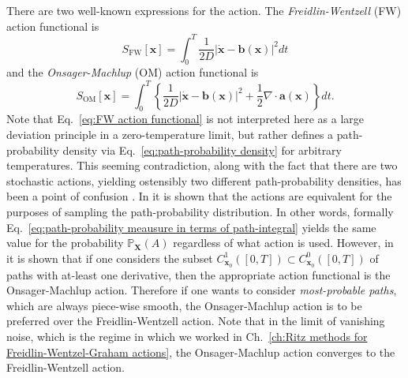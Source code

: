 There are two well-known expressions for the action. The \textit{Freidlin-Wentzell} (FW) action functional is \citep{adibStochasticActionsDiffusive2008, ventselSMALLRANDOMPERTURBATIONS1970, touchetteLargeDeviationApproach2009, grafkeNumericalComputationRare2019}
\begin{equation} \label{eq:FW action functional}
S_\text{FW}[\mathbf{x}] = \int_0^T \frac{1}{2 D} |\dot{\mathbf{x}} - \mathbf{b}(\mathbf{x})|^2 dt
\end{equation}
and the \textit{Onsager-Machlup} (OM) action functional is \citep{adibStochasticActionsDiffusive2008, durrOnsagerMachlupFunctionLagrangian1978a, stratonovichProbabilityFunctionalDiffusion1971, fujitaOnsagerMachlupFunctionDiffusion1982, onsagerFluctuationsIrreversibleProcesses1953, bachFunctionalsPathsDiffusion1977, horsthemkeOnsagerMachlupFunctionOne1975}
\begin{equation} \label{eq:OM action functional}
S_\text{OM}[\mathbf{x}] = \int_0^T \left\{ \frac{1}{2 D} |\dot{\mathbf{x}} - \mathbf{b}(\mathbf{x})|^2 + \frac{1}{2} \nabla \cdot \mathbf{a}(\mathbf{x}) \right\} dt.
\end{equation}
Note that Eq.~\ref{eq:FW action functional} is not interpreted here as a large deviation principle in a zero-temperature limit, but rather defines a path-probability density via Eq.~\ref{eq:path-probability density} for arbitrary temperatures. This seeming contradiction, along with the fact that there are two stochastic actions, yielding ostensibly two different path-probability densities, has been a point of confusion \citep{adibStochasticActionsDiffusive2008, gladrowExperimentalMeasurementRelative2021}.  In \citep{adibStochasticActionsDiffusive2008} it is shown that the actions are equivalent for the purposes of sampling the path-probability distribution. In other words, formally Eq.~\ref{eq:path-probability meausure in terms of path-integral} yields the same value for the probability $\mathbb{P}_\mathbf{X}(A)$ regardless of what action is used. However, in \citep{gladrowExperimentalMeasurementRelative2021} it is shown that if one considers the subset $C^1_{\mathbf{x}_0}([0,T]) \subset C^0_{\mathbf{x}_0}([0,T])$ of paths with at-least one derivative, then the appropriate action functional is the Onsager-Machlup action. Therefore if one wants to consider \textit{most-probable paths}, which are always piece-wise smooth, the Onsager-Machlup action is to be preferred over the Freidlin-Wentzell action. Note that in the limit of vanishing noise, which is the regime in which we worked in Ch.~\ref{ch:Ritz methods for Freidlin-Wentzel-Graham actions}, the Onsager-Machlup action converges to the Freidlin-Wentzell action. 
 

